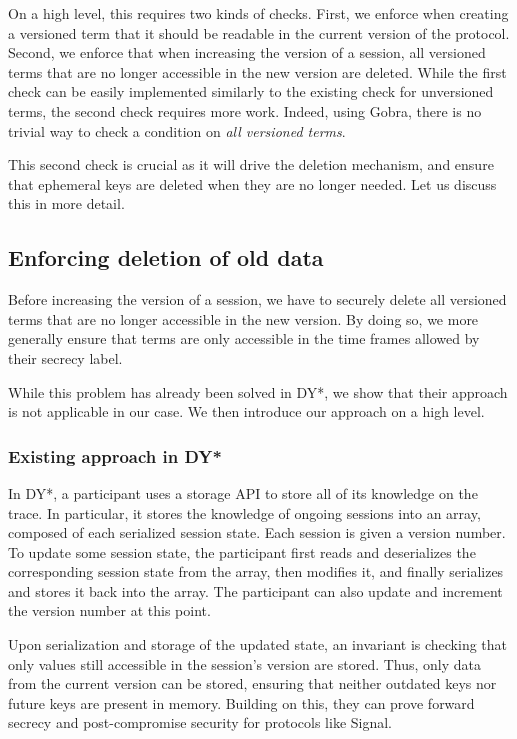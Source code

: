 On a high level, this requires two kinds of checks.
First, we enforce when creating a versioned term that it should be readable in the current version of the protocol.
Second, we enforce that when increasing the version of a session, all versioned terms that are no longer accessible in the new version are deleted.
While the first check can be easily implemented similarly to the existing check for unversioned terms, the second check requires more work. Indeed, using Gobra, there is no trivial way to check a condition on \emph{all versioned terms}.

This second check is crucial as it will drive the deletion mechanism, and ensure that ephemeral keys are deleted when they are no longer needed. Let us discuss this in more detail.

\subsection{Enforcing deletion of old data}
\label{sec:enforcing-deletion-of-old-data}

Before increasing the version of a session, we have to securely delete all versioned terms that are no longer accessible in the new version. By doing so, we more generally ensure that terms are only accessible in the time frames allowed by their secrecy label.

While this problem has already been solved in DY*, we show that their approach is not applicable in our case. We then introduce our approach on a high level.

\subsubsection{Existing approach in DY*}
\label{sec:existing-approach-in-dy}

In DY*, a participant uses a storage API to store all of its knowledge on the trace.
In particular, it stores the knowledge of ongoing sessions into an array, composed of each serialized session state.
Each session is given a version number.
To update some session state, the participant first reads and deserializes the corresponding session state from the array, then modifies it, and finally serializes and stores it back into the array.
The participant can also update and increment the version number at this point.

Upon serialization and storage of the updated state, an invariant is checking that only values still accessible in the session's version are stored.
Thus, only data from the current version can be stored, ensuring that neither outdated keys nor future keys are present in memory.
Building on this, they can prove forward secrecy and post-compromise security for protocols like Signal.

